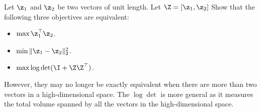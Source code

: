 \documentclass[../../book-main.tex]{subfiles}
\begin{document}
\begin{exercise}
    Let $\z_1$ and $\z_2$ be two vectors of unit length. Let $\Z = [\z_1, \z_2]$ Show that the following three objectives are equivalent:
\begin{itemize}
    \item $\max \z_1^\top \z_2$.
    \item $\min \|\z_1 - \z_2\|_2^2$.
    \item $\max \log \det (\I + \Z\Z^\top)$.
\end{itemize}
However, they may no longer be exactly equivalent when there are more than two vectors in a high-dimensional space. The $\log\det$ is more general as it measures the total volume spanned by all the vectors in the high-dimensional space. 
\end{exercise}
 
\end{document}
